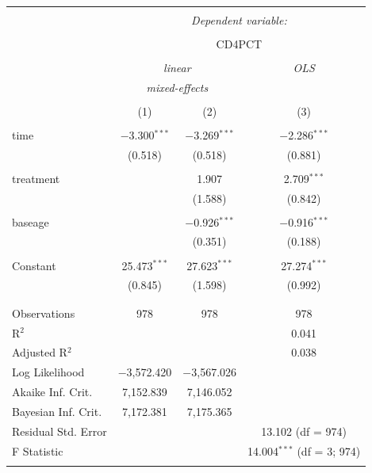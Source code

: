 \documentclass[12pt]{article}
\begin{document}
{\begin{table}[!htbp] \centering 
  \caption{} 
  \label{} 
\begin{tabular}{@{\extracolsep{5pt}}lccc} 
\\[-1.8ex]\hline 
\hline \\[-1.8ex] 
 & \multicolumn{3}{c}{\textit{Dependent variable:}} \\ 
\cline{2-4} 
\\[-1.8ex] & \multicolumn{3}{c}{CD4PCT} \\ 
\\[-1.8ex] & \multicolumn{2}{c}{\textit{linear}} & \textit{OLS} \\ 
 & \multicolumn{2}{c}{\textit{mixed-effects}} & \textit{} \\ 
\\[-1.8ex] & (1) & (2) & (3)\\ 
\hline \\[-1.8ex] 
 time & $-$3.300$^{***}$ & $-$3.269$^{***}$ & $-$2.286$^{***}$ \\ 
  & (0.518) & (0.518) & (0.881) \\ 
  & & & \\ 
 treatment &  & 1.907 & 2.709$^{***}$ \\ 
  &  & (1.588) & (0.842) \\ 
  & & & \\ 
 baseage &  & $-$0.926$^{***}$ & $-$0.916$^{***}$ \\ 
  &  & (0.351) & (0.188) \\ 
  & & & \\ 
 Constant & 25.473$^{***}$ & 27.623$^{***}$ & 27.274$^{***}$ \\ 
  & (0.845) & (1.598) & (0.992) \\ 
  & & & \\ 
\hline \\[-1.8ex] 
Observations & 978 & 978 & 978 \\ 
R$^{2}$ &  &  & 0.041 \\ 
Adjusted R$^{2}$ &  &  & 0.038 \\ 
Log Likelihood & $-$3,572.420 & $-$3,567.026 &  \\ 
Akaike Inf. Crit. & 7,152.839 & 7,146.052 &  \\ 
Bayesian Inf. Crit. & 7,172.381 & 7,175.365 &  \\ 
Residual Std. Error &  &  & 13.102 (df = 974) \\ 
F Statistic &  &  & 14.004$^{***}$ (df = 3; 974) \\ 
\hline 
\hline \\[-1.8ex] 

\end{tabular}
\end{table}}
\end{document}

